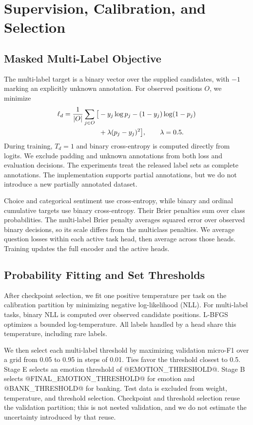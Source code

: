 \documentclass[conference]{IEEEtran}
\begin{document}
\section{Supervision, Calibration, and Selection}
\subsection{Masked Multi-Label Objective}
The multi-label target is a binary vector over the supplied candidates, with $-1$ marking an explicitly unknown annotation. For observed positions $O$, we minimize
\begin{align}
\ell_d={1\over|O|}\sum_{j\in O}\big[&-y_j\log p_j-(1-y_j)\log(1-p_j)\nonumber\\
&+\lambda(p_j-y_j)^2\big],\qquad\lambda=0.5.
\end{align}
During training, $T_d=1$ and binary cross-entropy is computed directly from logits. We exclude padding and unknown annotations from both loss and evaluation decisions. The experiments treat the released label sets as complete annotations. The implementation supports partial annotations, but we do not introduce a new partially annotated dataset.

Choice and categorical sentiment use cross-entropy, while binary and ordinal cumulative targets use binary cross-entropy. Their Brier penalties sum over class probabilities. The multi-label Brier penalty averages squared error over observed binary decisions, so its scale differs from the multiclass penalties. We average question losses within each active task head, then average across those heads. Training updates the full encoder and the active heads.

\subsection{Probability Fitting and Set Thresholds}
After checkpoint selection, we fit one positive temperature per task on the calibration partition by minimizing negative log-likelihood (NLL). For multi-label tasks, binary NLL is computed over observed candidate positions. L-BFGS optimizes a bounded log-temperature. All labels handled by a head share this temperature, including rare labels.

We then select each multi-label threshold by maximizing validation micro-F1 over a grid from 0.05 to 0.95 in steps of 0.01. Ties favor the threshold closest to 0.5. Stage E selects an emotion threshold of @EMOTION_THRESHOLD@. Stage B selects @FINAL_EMOTION_THRESHOLD@ for emotion and @BANK_THRESHOLD@ for banking. Test data is excluded from weight, temperature, and threshold selection. Checkpoint and threshold selection reuse the validation partition; this is not nested validation, and we do not estimate the uncertainty introduced by that reuse.
\end{document}
